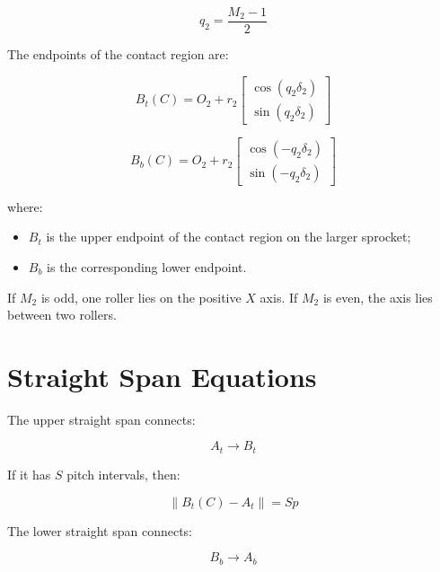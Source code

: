 \documentclass[12pt,a4paper]{article}
\begin{document}
\begin{equation}
q_2=\frac{M_2-1}{2}
\end{equation}

The endpoints of the contact region are:

\begin{equation}
B_t(C)=
O_2+
r_2
\begin{bmatrix}
\cos(q_2\delta_2)\\
\sin(q_2\delta_2)
\end{bmatrix}
\end{equation}

\begin{equation}
B_b(C)=
O_2+
r_2
\begin{bmatrix}
\cos(-q_2\delta_2)\\
\sin(-q_2\delta_2)
\end{bmatrix}
\end{equation}

where:

\begin{itemize}
    \item $B_t$ is the upper endpoint of the contact region on the larger sprocket;
    \item $B_b$ is the corresponding lower endpoint.
\end{itemize}

If $M_2$ is odd, one roller lies on the positive $X$ axis. If $M_2$ is even, the axis lies between two rollers.

\section{Straight Span Equations}

The upper straight span connects:

\begin{equation}
A_t \rightarrow B_t
\end{equation}

If it has $S$ pitch intervals, then:

\begin{equation}
\left\lVert B_t(C)-A_t \right\rVert = Sp
\label{eq:upper_run}
\end{equation}

The lower straight span connects:

\begin{equation}
B_b \rightarrow A_b
\end{equation}
\end{document}
